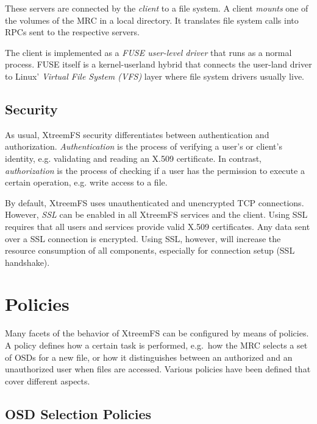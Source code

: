 \documentclass[a4paper,10pt]{book}
\begin{document}
These servers are connected by the \emph{client} to a file system. A client \emph{mounts} one of the volumes of the MRC in a local directory. It translates file system calls into RPCs sent to the respective servers.

The client is implemented as a \emph{FUSE user-level driver} that runs as a normal process. FUSE itself is a kernel-userland hybrid that connects the user-land driver to Linux' \emph{Virtual File System (VFS)} layer where file system drivers usually live.


\subsection{Security}

As usual, XtreemFS security differentiates between authentication and authorization. \emph{Authentication}  is the process of verifying a user's or client's identity, e.g. validating and reading an X.509 certificate. In contrast, \emph{authorization} is the process of checking if a user has the permission to execute a certain operation, e.g. write access to a file.

By default, XtreemFS uses unauthenticated and unencrypted TCP connections. However, \emph{SSL} can be enabled in all XtreemFS services and the client. Using SSL requires that all users and services provide valid X.509 certificates. Any data sent over a SSL connection is encrypted. Using SSL, however, will increase the resource consumption of all components, especially for connection setup (SSL handshake).


\section{Policies}

Many facets of the behavior of XtreemFS can be configured by means of policies. A policy defines how a certain task is performed, e.g.\ how the MRC selects a set of OSDs for a new file, or how it distinguishes between an authorized and an unauthorized user when files are accessed. Various policies have been defined that cover different aspects.

\subsection{OSD Selection Policies} \label{sec:osd_policies}
\end{document}

